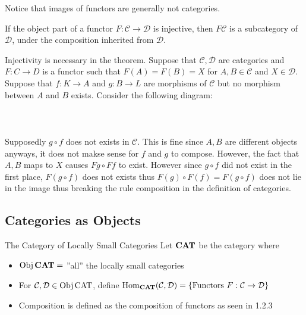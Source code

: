 \documentclass[a4paper]{article}
\begin{document}
Notice that images of functors are generally not categories. 

\begin{thm}{}{} If the object part of a functor $F:\mathcal{C}\to\mathcal{D}$ is injective, then $F\mathcal{C}$ is a subcategory of $\mathcal{D}$, under the composition inherited from $\mathcal{D}$. 
\end{thm}

Injectivity is necessary in the theorem. Suppose that $\mathcal{C},\mathcal{D}$ are categories and $F:C\to D$ is a functor such that $F(A)=F(B)=X$ for $A,B\in\mathcal{C}$ and $X\in\mathcal{D}$. Suppose that $f:K\to A$ and $g:B\to L$ are morphisms of $\mathcal{C}$ but no morphism between $A$ and $B$ exists. Consider the following diagram: \\~\\
\\~\\
Supposedly $g\circ f$ does not exists in $\mathcal{C}$. This is fine since $A,B$ are different objects anyways, it does not makse sense for $f$ and $g$ to compose. However, the fact that $A,B$ maps to $X$ causes $Fg\circ Ff$ to exist. However since $g\circ f$ did not exist in the first place, $F(g\circ f)$ does not exists thus $F(g)\circ F(f)=F(g\circ f)$ does not lie in the image thus breaking the rule composition in the definition of categories. 

\subsection{Categories as Objects}
\begin{defn}{The Category of Locally Small Categories}{} Let $\bold{CAT}$ be the category where 
\begin{itemize}
\item $\operatorname{Obj}\bold{CAT}=$ ''all'' the locally small categories
\item For $\mathcal{C},\mathcal{D}\in\operatorname{Obj}\text{CAT}$, define $\operatorname{Hom}_{\bold{CAT}}(\mathcal{C},\mathcal{D})=\{\text{Functors }F:\mathcal{C}\to\mathcal{D}\}$
\item Composition is defined as the composition of functors as seen in 1.2.3
\end{itemize}
\end{defn}
\end{document}
